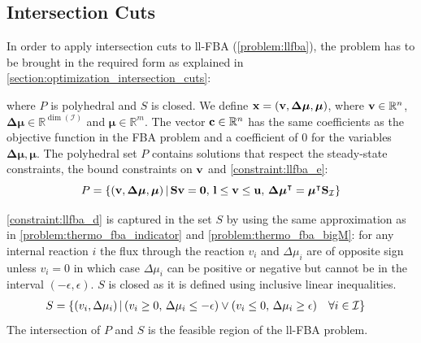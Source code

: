 \subsection{Intersection Cuts} \label{section:methods_interscetion_cuts}
In order to apply intersection cuts to \textsf{ll-FBA} (\cref{problem:llfba}), the problem has to be brought in the required form as explained in \cref{section:optimization_intersection_cuts}:
\quad where $P$ is polyhedral and $S$ is closed.
We define $\bold x = (\bold v, \boldsymbol{\Delta \mu}, \boldsymbol\mu)$, where $\bold v \in \mathbb{R}^n$, $\boldsymbol{\Delta \mu} \in \mathbb{R}^{\dim (\mathcal{I})}$ and $\boldsymbol \mu \in \mathbb{R}^m$. The vector $\bold c \in \mathbb{R}^n$ has the same coefficients as the objective function in the \textsf{FBA} problem and a coefficient of $0$ for the variables $\boldsymbol{\Delta \mu}, \boldsymbol \mu$. The polyhedral set $P$ contains solutions that respect the steady-state constraints, the bound constraints on $\bold v$ and \cref{constraint:llfba_e}:
\begin{equation*}
    \centering
    P = \{(\bold v, \boldsymbol{\Delta \mu}, \boldsymbol\mu) \, | \, \bold S \bold v= \bold 0, \, \bold l \leq \bold v \leq \bold u, \, \boldsymbol{\Delta \mu}^\intercal = \boldsymbol \mu^\intercal \bold S_{\mathcal{I}}\}
\end{equation*}

\cref{constraint:llfba_d} is captured in the set $S$ by using the same approximation as in \cref{problem:thermo_fba_indicator} and \cref{problem:thermo_fba_bigM}:
for any internal reaction $i$ the flux through the reaction $v_i$ and $\Delta \mu_i$ are of opposite sign unless $v_i=0$ in which case $\Delta \mu_i$ can be positive or negative but cannot be in the interval $(- \epsilon, \epsilon)$. $S$ is closed as it is defined using inclusive linear inequalities. 
\begin{align*}
    \centering
    S &= \{(v_i, \Delta\mu_i) \, | \, (v_i \geq 0, \, \Delta \mu_i \leq - \epsilon) \lor (v_i \leq 0, \, \Delta \mu_i \geq \epsilon) \quad \forall i \in \mathcal{I}\}
\end{align*}
The intersection of $P$ and $S$ is the feasible region of the ll-FBA problem. 

